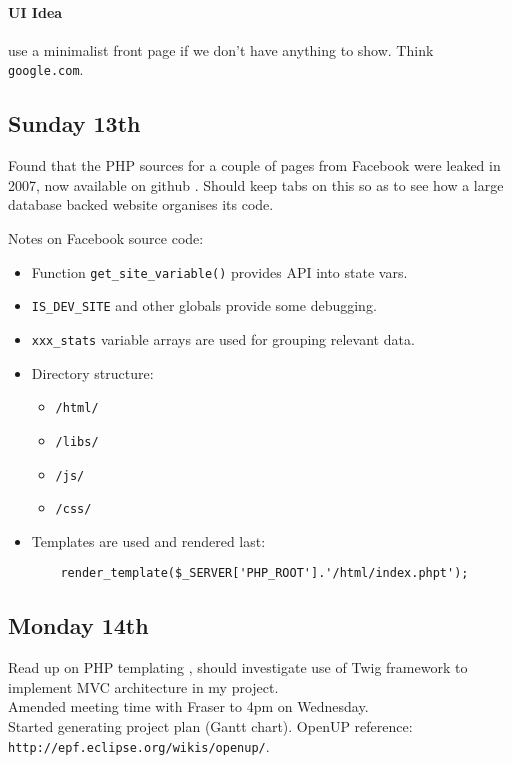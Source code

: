 \paragraph{UI Idea} use a minimalist front page if we don't have anything to
show. Think \texttt{google.com}.

\subsection{Sunday 13th}
Found that the PHP sources for a couple of pages from Facebook were leaked in
2007, now available on github \cite{Buvrilovic2013}. Should keep tabs on this so
as to see how a large database backed website organises its code.

\noindent
Notes on Facebook source code:
\begin{itemize}
\item Function \texttt{get\_site\_variable()} provides API into state vars.
\item \texttt{IS\_DEV\_SITE} and other globals provide some debugging.
\item \texttt{xxx\_stats} variable arrays are used for grouping relevant data.
\item Directory structure:
  \begin{itemize}
  \item \texttt{/html/}
  \item \texttt{/libs/}
  \item \texttt{/js/}
  \item \texttt{/css/}
  \end{itemize}
\item Templates are used and rendered last:
\begin{verbatim}
    render_template($_SERVER['PHP_ROOT'].'/html/index.phpt');
\end{verbatim}
\end{itemize}

\subsection{Monday 14th}
Read up on PHP templating \cite{Rakowski2011}, should investigate use of Twig
framework to implement MVC architecture in my project.\\

\noindent
Amended meeting time with Fraser to 4pm on Wednesday.\\

\noindent
Started generating project plan (Gantt chart). OpenUP reference:
\texttt{http://epf.eclipse.org/wikis/openup/}.

